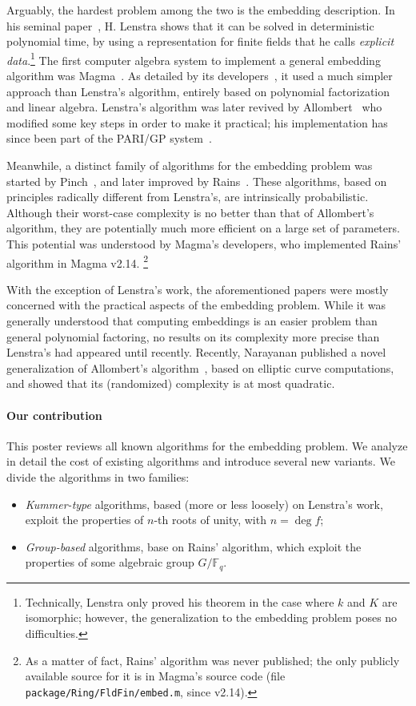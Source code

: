 \documentclass[12pt]{article}
\def\F {\ensuremath{\mathbb{F}}}
\begin{document}
Arguably, the hardest problem among the two is the embedding
description. %
In his
seminal paper~\cite{LenstraJr91}, H. Lenstra shows that it can be solved in
deterministic polynomial time, by using a representation for finite
fields that he calls \emph{explicit data}.\footnote{Technically,
  Lenstra only proved his theorem in the case where $k$ and $K$ are
  isomorphic; however, the generalization to the embedding problem
  poses no difficulties.} %
The first computer algebra system to implement a general
embedding algorithm was Magma~\cite{MAGMA}. %
As detailed by its developers~\cite{bosma+cannon+steel97}, it used a
much simpler approach than Lenstra's algorithm, entirely based on
polynomial factorization and linear algebra. %
Lenstra's algorithm was later revived by
Allombert~\cite{Allombert02,Allombert02-rev} who modified some key
steps in order to make it practical; his implementation has since been
part of the PARI/GP system~\cite{Pari}.

Meanwhile, a distinct family of algorithms for the embedding problem
was started by Pinch~\cite{Pinch}, and later improved by
Rains~\cite{rains2008}. %
These algorithms, based on principles radically different from
Lenstra's, are intrinsically probabilistic. %
Although their worst-case complexity is no better than that of
Allombert's algorithm, they are potentially much more efficient on a
large set of parameters. %
This potential was understood by Magma's developers, who implemented
Rains' algorithm in Magma v2.14.%
\footnote{As a matter of fact, Rains' algorithm was never published;
  the only publicly available source for it is in Magma's source code
  (file \texttt{package/Ring/FldFin/embed.m}, since v2.14).}

With the exception of Lenstra's work, the aforementioned papers were
mostly concerned with the practical aspects of the embedding
problem. %
While it was generally understood that computing embeddings is an
easier problem than general polynomial factoring, no results on its
complexity more precise than Lenstra's had appeared until recently. %
Recently, Narayanan published a novel generalization of Allombert's
algorithm~\cite{narayanan2016fast}, based on elliptic curve
computations, and showed that its (randomized) complexity is at most
quadratic.

\paragraph{Our contribution}
This poster reviews all known algorithms for the embedding
problem. We analyze in detail the cost of existing algorithms and
introduce several new variants. %
We divide the algorithms in two families:
\begin{itemize}
\item \emph{Kummer-type} algorithms, based (more or less loosely) on
  Lenstra's work, exploit the properties of $n$-th roots of
  unity, with $n=\deg f$;
\item \emph{Group-based} algorithms, base on Rains' algorithm, which
  exploit the properties of some algebraic group $G/\F_q$.
\end{itemize}
\end{document}
